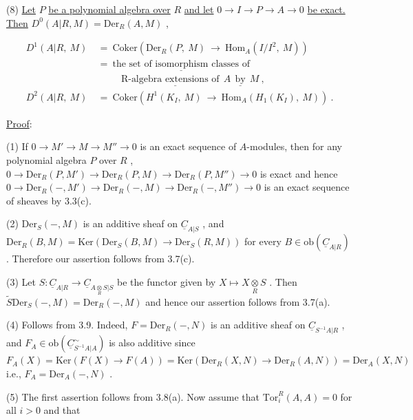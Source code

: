 (8) \underline{Let}  $P$  \underline{be a polynomial algebra over}  $R$  \underline{and let}  $0 \to I \to P \to A \to 0$ \underline{be exact. Then}  $D^0(A|R, M) = \mathrm{Der}_R(A, M)$  ,

\begin{equation*}
\begin{aligned}
D^1(A|R, \ M) \ &= \ \mathrm{Coker}(\mathrm{Der}_R(P, \ M) \ \to \ \mathrm{Hom}_A(I/I^2, \ M))\\
&= \ \underline{\text{the set of isomorphism classes of}}\\
&\qquad\ \ \text{R-}\underline{\text{algebra extensions of}} \ \ A \ \ \underline{\text{by}} \ \ M \ ,\\
D^2(A|R, \ M) \ &= \ \mathrm{Coker}(H^1(K_I, \ M) \ \to \ \mathrm{Hom}_A(H_1(K_I), \ M)) \ .
\end{aligned}
\end{equation*}

\underline{Proof}:

(1) If  $0 \to M' \to M \to M'' \to 0$  is an exact sequence of $A$-modules, then for any polynomial algebra  $P$  over  $R$  ,  $0 \to \mathrm{Der}_R(P, M') \to \mathrm{Der}_R(P, M) \to \mathrm{Der}_R(P, M'') \to 0$ is exact and hence  $0 \to \mathrm{Der}_R(-, M') \to \mathrm{Der}_R(-, M) \to \mathrm{Der}_R(-, M'') \to 0$  is an exact sequence of sheaves by 3.3(c).

(2) $\mathrm{Der}_S(-, M)$  is an additive sheaf on  $\underline{C}_{A|S}$  , and $\mathrm{Der}_R(B, M) = \mathrm{Ker}(\mathrm{Der}_S(B, M) \to \mathrm{Der}_S(R, M))$  for every  $B \in \mathrm{ob}(\underline{C}_{A|R})$  . Therefore our assertion follows from 3.7(c).

(3) Let  $S : \underline{C}_{A|R} \to \underline{C}_{A \underset{R}{\otimes} S|S}$  be the functor given by  $X \longmapsto X \underset{R}{\otimes} S$  . Then $\widetilde{S}\mathrm{Der}_S(-, M) = \mathrm{Der}_R(-, M)$  and hence our assertion follows from 3.7(a).


(4)  Follows from 3.9. Indeed,  $F = \mathrm{Der}_R(-, N)$  is an additive sheaf on $\underline{C}_{S^{-1}A|R}$  , and  $F_A \in \mathrm{ob}\left(\underline{C}^{\sim}_{S^{-1}A|A}\right)$  is also additive since $F_A(X) = \mathrm{Ker}(F(X) \to F(A)) = \mathrm{Ker}(\mathrm{Der}_R(X, N) \to \mathrm{Der}_R(A, N)) = \mathrm{Der}_A(X, N)$  i.e., $F_A = \mathrm{Der}_A(-, N)$  .

(5)  The first assertion follows from 3.8(a). Now assume that $\mathrm{Tor}^R_i(A, A) = 0$  for all  $i > 0$  and that

